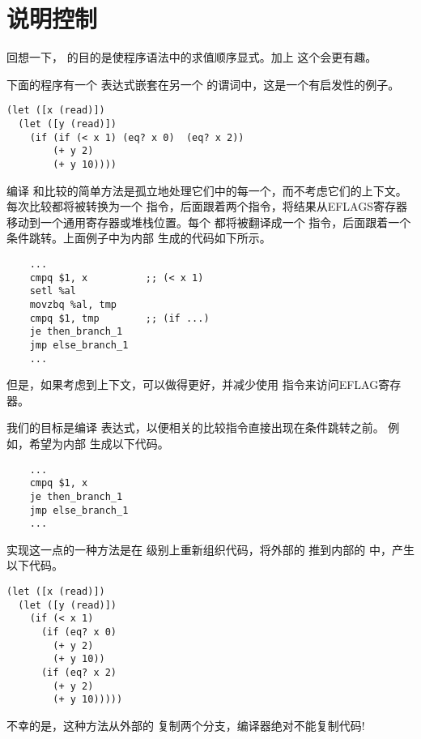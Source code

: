 \documentclass[11pt]{book}
\begin{document}
\section{说明控制}
\label{sec:explicate-control-Rif}

回想一下，  的目的是使程序语法中的求值顺序显式。加上  这个会更有趣。

下面的程序有一个
 表达式嵌套在另一个  的谓词中，这是一个有启发性的例子。
\begin{center}
\begin{minipage}{0.96\textwidth}
\begin{lstlisting}
(let ([x (read)])
  (let ([y (read)])
    (if (if (< x 1) (eq? x 0)  (eq? x 2))
        (+ y 2)
        (+ y 10))))
\end{lstlisting}
\end{minipage}
\end{center}
%
编译  和比较的简单方法是孤立地处理它们中的每一个，而不考虑它们的上下文。每次比较都将被转换为一个  指令，后面跟着两个指令，将结果从EFLAGS寄存器移动到一个通用寄存器或堆栈位置。每个  都将被翻译成一个  指令，后面跟着一个条件跳转。上面例子中为内部  生成的代码如下所示。
\begin{center}
\begin{minipage}{0.96\textwidth}
\begin{lstlisting}
    ...
    cmpq $1, x          ;; (< x 1)
    setl %al
    movzbq %al, tmp
    cmpq $1, tmp        ;; (if ...)
    je then_branch_1
    jmp else_branch_1
    ...
\end{lstlisting}
\end{minipage}
\end{center}
但是，如果考虑到上下文，可以做得更好，并减少使用  指令来访问EFLAG寄存器。

我们的目标是编译  表达式，以便相关的比较指令直接出现在条件跳转之前。
例如，希望为内部  生成以下代码。
\begin{center}
\begin{minipage}{0.96\textwidth}
\begin{lstlisting}
    ...
    cmpq $1, x
    je then_branch_1
    jmp else_branch_1
    ...
\end{lstlisting}
\end{minipage}
\end{center}
实现这一点的一种方法是在
\LangIf{} 级别上重新组织代码，将外部的  推到内部的  中，产生以下代码。
\begin{center}
\begin{minipage}{0.96\textwidth}
\begin{lstlisting}
(let ([x (read)])
  (let ([y (read)])
    (if (< x 1) 
      (if (eq? x 0)
        (+ y 2)
        (+ y 10))
      (if (eq? x 2)
        (+ y 2)
        (+ y 10)))))
\end{lstlisting}
\end{minipage}
\end{center}
不幸的是，这种方法从外部的  复制两个分支，编译器绝对不能复制代码!
\end{document}
